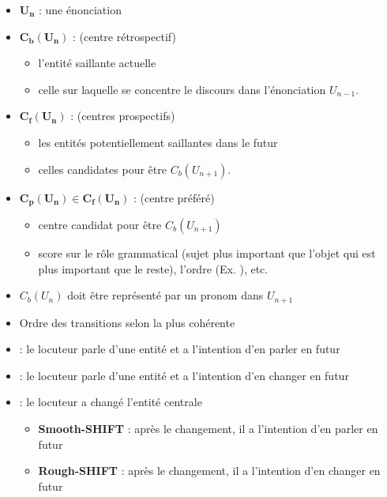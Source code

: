 \documentclass{KodeBook}
\begin{document}
\begin{itemize}
	\item $\mathbf{U_n}$ : une énonciation
	\item $\mathbf{C_b(U_n)}$ :  (centre rétrospectif)
	\begin{itemize}
		\item l'entité saillante actuelle
		\item celle sur laquelle se concentre le discours dans l'énonciation $ U_{n-1} $.
	\end{itemize}
	\item $\mathbf{C_f(U_n)}$ :  (centres prospectifs)
	\begin{itemize}
		\item les entités potentiellement saillantes dans le futur
		\item celles candidates pour être $C_b(U_{n+1})$.
	\end{itemize}
	\item $\mathbf{C_p(U_n) \in C_f(U_n)}$ :  (centre préféré)
	\begin{itemize}
		\item centre candidat pour être $C_b(U_{n+1})$
		\item score sur le rôle grammatical (sujet plus important que l'objet qui est plus important que le reste), l'ordre (Ex. ), etc.
	\end{itemize}
	\item $C_b(U_n)$ doit être représenté par un pronom dans $U_{n+1}$
\end{itemize}

\begin{itemize}
	\item Ordre des transitions selon la plus cohérente
	\item {} : le locuteur parle d'une entité et a l'intention d'en parler en futur
	\item {} : le locuteur parle d'une entité et a l'intention d'en changer en futur
	\item {} : le locuteur a changé l'entité centrale
	\begin{itemize}
		\item \textbf{Smooth-SHIFT} : après le changement, il a l'intention d'en parler en futur
		\item \textbf{Rough-SHIFT} : après le changement, il a l'intention d'en changer en futur
	\end{itemize}
\end{itemize}
\end{document}
